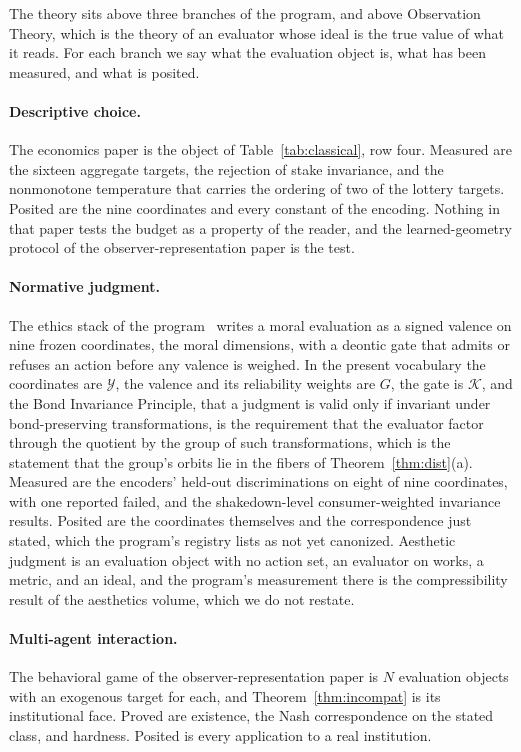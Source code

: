 \documentclass[11pt]{article}
\theoremstyle{definition}
\theoremstyle{remark}
\newcommand{\K}{\mathcal{K}}
\newcommand{\Y}{\mathcal{Y}}
\begin{document}
The theory sits above three branches of the program, and above Observation Theory, which is the theory of an evaluator whose ideal is the true value of what it reads.
For each branch we say what the evaluation object is, what has been measured, and what is posited.

\paragraph{Descriptive choice.}
The economics paper is the object of Table~\ref{tab:classical}, row four.
Measured are the sixteen aggregate targets, the rejection of stake invariance, and the nonmonotone temperature that carries the ordering of two of the lottery targets.
Posited are the nine coordinates and every constant of the encoding.
Nothing in that paper tests the budget as a property of the reader, and the learned-geometry protocol of the observer-representation paper is the test.

\paragraph{Normative judgment.}
The ethics stack of the program~\cite{bond2026encyclopedia} writes a moral evaluation as a signed valence on nine frozen coordinates, the moral dimensions, with a deontic gate that admits or refuses an action before any valence is weighed.
In the present vocabulary the coordinates are $\Y$, the valence and its reliability weights are $G$, the gate is $\K$, and the Bond Invariance Principle, that a judgment is valid only if invariant under bond-preserving transformations, is the requirement that the evaluator factor through the quotient by the group of such transformations, which is the statement that the group's orbits lie in the fibers of Theorem~\ref{thm:dist}(a).
Measured are the encoders' held-out discriminations on eight of nine coordinates, with one reported failed, and the shakedown-level consumer-weighted invariance results.
Posited are the coordinates themselves and the correspondence just stated, which the program's registry lists as not yet canonized.
Aesthetic judgment is an evaluation object with no action set, an evaluator on works, a metric, and an ideal, and the program's measurement there is the compressibility result of the aesthetics volume, which we do not restate.

\paragraph{Multi-agent interaction.}
The behavioral game of the observer-representation paper is $N$ evaluation objects with an exogenous target for each, and Theorem~\ref{thm:incompat} is its institutional face.
Proved are existence, the Nash correspondence on the stated class, and hardness.
Posited is every application to a real institution.
\end{document}
